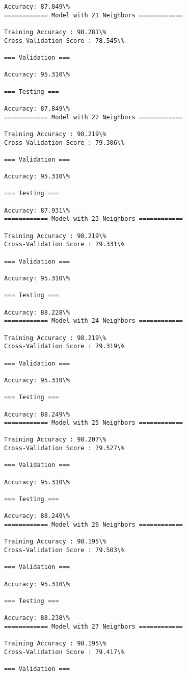 \documentclass[11pt]{article}
\begin{document}
\begin{Verbatim}[commandchars=\\\{\}]
Accuracy: 87.849\%
============ Model with 21 Neighbors ============

Training Accuracy : 98.281\%
Cross-Validation Score : 78.545\%

=== Validation ===

Accuracy: 95.310\%

=== Testing ===

Accuracy: 87.849\%
============ Model with 22 Neighbors ============

Training Accuracy : 98.219\%
Cross-Validation Score : 79.306\%

=== Validation ===

Accuracy: 95.310\%

=== Testing ===

Accuracy: 87.931\%
============ Model with 23 Neighbors ============

Training Accuracy : 98.219\%
Cross-Validation Score : 79.331\%

=== Validation ===

Accuracy: 95.310\%

=== Testing ===

Accuracy: 88.228\%
============ Model with 24 Neighbors ============

Training Accuracy : 98.219\%
Cross-Validation Score : 79.319\%

=== Validation ===

Accuracy: 95.310\%

=== Testing ===

Accuracy: 88.249\%
============ Model with 25 Neighbors ============

Training Accuracy : 98.207\%
Cross-Validation Score : 79.527\%

=== Validation ===

Accuracy: 95.310\%

=== Testing ===

Accuracy: 88.249\%
============ Model with 26 Neighbors ============

Training Accuracy : 98.195\%
Cross-Validation Score : 79.503\%

=== Validation ===

Accuracy: 95.310\%

=== Testing ===

Accuracy: 88.238\%
============ Model with 27 Neighbors ============

Training Accuracy : 98.195\%
Cross-Validation Score : 79.417\%

=== Validation ===


\end{Verbatim}
\end{document}
